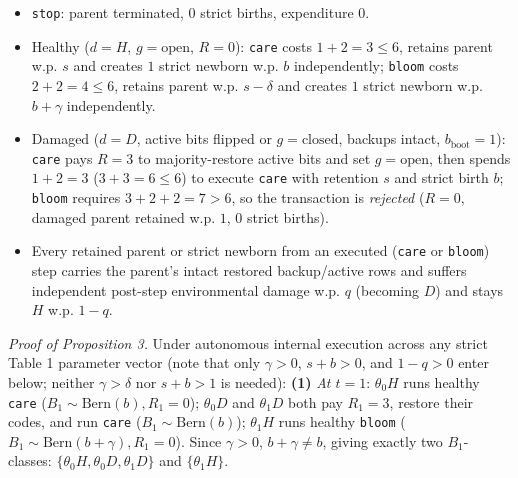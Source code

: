 \documentclass[11pt,a4paper]{article}
\providecommand{\tightlist}{\setlength{\itemsep}{2pt}\setlength{\parskip}{0pt}}
\begin{document}
\begin{itemize}
\tightlist
\item
  \texttt{stop}: parent terminated, \(0\) strict births, expenditure
  \(0\).
\item
  Healthy (\(d = H\), \(g = \mathrm{open}\), \(R = 0\)): \texttt{care}
  costs \(1 + 2 = 3 \le 6\), retains parent w.p. \(s\) and creates \(1\)
  strict newborn w.p. \(b\) independently; \texttt{bloom} costs
  \(2 + 2 = 4 \le 6\), retains parent w.p. \(s - \delta\) and creates
  \(1\) strict newborn w.p. \(b + \gamma\) independently.
\item
  Damaged (\(d = D\), active bits flipped or \(g = \mathrm{closed}\),
  backups intact, \(b_{\mathrm{boot}} = 1\)): \texttt{care} pays
  \(R = 3\) to majority-restore active bits and set
  \(g = \mathrm{open}\), then spends \(1 + 2 = 3\) (\(3+3=6 \le 6\)) to
  execute \texttt{care} with retention \(s\) and strict birth \(b\);
  \texttt{bloom} requires \(3 + 2 + 2 = 7 > 6\), so the transaction is
  \emph{rejected} (\(R = 0\), damaged parent retained w.p. \(1\), \(0\)
  strict births).
\item
  Every retained parent or strict newborn from an executed
  (\texttt{care} or \texttt{bloom}) step carries the parent's intact
  restored backup/active rows and suffers independent post-step
  environmental damage w.p. \(q\) (becoming \(D\)) and stays \(H\) w.p.
  \(1-q\).
\end{itemize}

\emph{Proof of Proposition 3.} Under autonomous internal execution
across any strict Table 1 parameter vector (note that only
\(\gamma > 0\), \(s + b > 0\), and \(1 - q > 0\) enter below; neither
\(\gamma > \delta\) nor \(s + b > 1\) is needed): \textbf{(1)} \emph{At
\(t=1\)}: \(\theta_0 H\) runs healthy \texttt{care}
(\(B_1 \sim \mathrm{Bern}(b), R_1 = 0\)); \(\theta_0 D\) and
\(\theta_1 D\) both pay \(R_1 = 3\), restore their codes, and run
\texttt{care} (\(B_1 \sim \mathrm{Bern}(b)\)); \(\theta_1 H\) runs
healthy \texttt{bloom} (\(B_1 \sim \mathrm{Bern}(b+\gamma), R_1 = 0\)).
Since \(\gamma > 0\), \(b + \gamma \neq b\), giving exactly two
\(B_1\)-classes: \(\{\theta_0 H, \theta_0 D, \theta_1 D\}\) and
\(\{\theta_1 H\}\).
\end{document}

